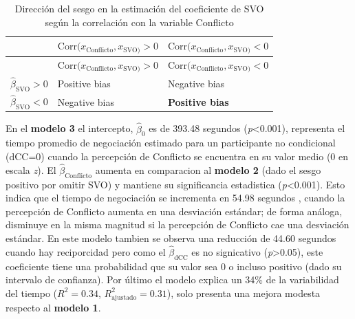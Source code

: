 \documentclass[
  spanish,
  10pt,
]{article}
\begin{document}
\begin{longtable}[]{@{}
  >{\raggedright\arraybackslash}p{}
  >{\centering\arraybackslash}p{}
  >{\centering\arraybackslash}p{}@{}}
\caption{Dirección del sesgo en la estimación del coeficiente de SVO
según la correlación con la variable Conflicto}\tabularnewline
\toprule\noalign{}
\begin{minipage}[b]{\linewidth}\raggedright
\end{minipage} & \begin{minipage}[b]{\linewidth}\centering
\(\text{Corr}(x_{\text{Conflicto}}, x_{\text{SVO})} > 0\)
\end{minipage} & \begin{minipage}[b]{\linewidth}\centering
\(\text{Corr}(x_{\text{Conflicto}}, x_{\text{SVO})} < 0\)
\end{minipage} \\
\midrule\noalign{}
\endfirsthead
\toprule\noalign{}
\begin{minipage}[b]{\linewidth}\raggedright
\end{minipage} & \begin{minipage}[b]{\linewidth}\centering
\(\text{Corr}(x_{\text{Conflicto}}, x_{\text{SVO})} > 0\)
\end{minipage} & \begin{minipage}[b]{\linewidth}\centering
\(\text{Corr}(x_{\text{Conflicto}}, x_{\text{SVO})} < 0\)
\end{minipage} \\
\midrule\noalign{}
\endhead
\bottomrule\noalign{}
\endlastfoot
\(\hat\beta_{\text{SVO}} > 0\) & Positive bias & Negative bias \\
\(\hat\beta_{\text{SVO}} < 0\) & Negative bias & \textbf{Positive
bias} \\
\end{longtable}

En el \textbf{modelo 3} el intercepto, \(\hat{\beta}_0\) es de 393.48
segundos (\emph{p}\textless0.001), representa el tiempo promedio de
negociación estimado para un participante no condicional (dCC=0) cuando
la percepción de Conflicto se encuentra en su valor medio (0 en escala
\emph{z}). El \(\hat{\beta}_{\text{Conflicto}}\) aumenta en comparacion
al \textbf{modelo 2} (dado el sesgo positivo por omitir SVO) y mantiene
su significancia estadistica (\emph{p}\textless0.001). Esto indica que
el tiempo de negociación se incrementa en 54.98 segundos , cuando la
percepción de Conflicto aumenta en una desviación estándar; de forma
análoga, disminuye en la misma magnitud si la percepción de Conflicto
cae una desviación estándar. En este modelo tambien se observa una
reducción de 44.60 segundos cuando hay reciporcidad pero como el
\(\hat{\beta}_{\text{dCC}}\) es no signicativo
(\emph{p}\textgreater0.05), este coeficiente tiene una probabilidad que
su valor sea 0 o incluso positivo (dado su intervalo de confianza). Por
último el modelo explica un 34\% de la variabilidad del tiempo
(\(R^2 = 0.34\), \(R^2_{\text{ajustado}} = 0.31\)), solo presenta una
mejora modesta respecto al \textbf{modelo 1}.
\end{document}
